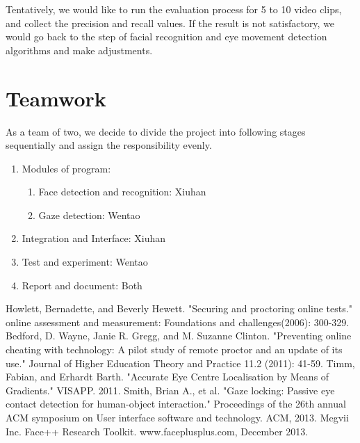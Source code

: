 \documentclass[11pt,letterpaper]{article}
\begin{document}
Tentatively, we would like to run the evaluation process for 5 to 10 video clips, and collect the precision and recall values. If the result is not satisfactory, we would go back to the step of facial recognition and eye movement detection algorithms and make adjustments.

\section{Teamwork}

As a team of two, we decide to divide the project into following stages sequentially and assign the responsibility evenly.

\begin{enumerate}
\item Modules of program:
\begin{enumerate}
 \item Face detection and recognition: Xiuhan
 \item Gaze detection: Wentao
\end{enumerate}
\item Integration and Interface: Xiuhan
\item Test and experiment: Wentao
\item Report and document: Both
\end{enumerate}

\begin{thebibliography}{9}

 Howlett, Bernadette, and Beverly Hewett. "Securing and proctoring online tests." online assessment and measurement: Foundations and challenges(2006): 300-329.
 Bedford, D. Wayne, Janie R. Gregg, and M. Suzanne Clinton. "Preventing online cheating with technology: A pilot study of remote proctor and an update of its use." Journal of Higher Education Theory and Practice 11.2 (2011): 41-59.
 Timm, Fabian, and Erhardt Barth. "Accurate Eye Centre Localisation by Means of Gradients." VISAPP. 2011.
 Smith, Brian A., et al. "Gaze locking: Passive eye contact detection for human-object interaction." Proceedings of the 26th annual ACM symposium on User interface software and technology. ACM, 2013.
 Megvii Inc. Face++ Research Toolkit. www.faceplusplus.com, December 2013.

\end{thebibliography}
\end{document}
